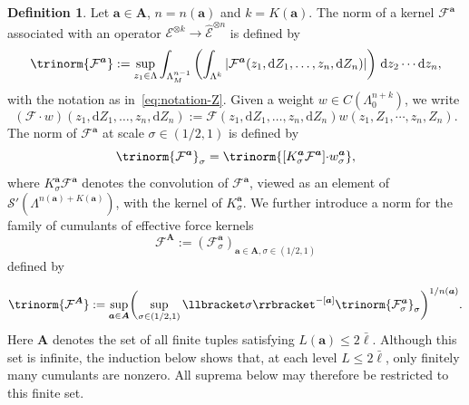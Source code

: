 \documentclass{article}
\numberwithin{equation}{section}
\newcommand{\assign}{:=}
\newcommand{\mathd}{\mathrm{d}}
\theoremstyle{plain}
\theoremstyle{definition}
\newtheorem{definition}[theorem]{Definition}
\begin{document}
\begin{definition}
  \label{def:norm-cumulants}Let $\boldsymbol{a} \in \boldsymbol{A}$, $n = n
  (\boldsymbol{a})$ and $k = K (\boldsymbol{a})$. The norm of a kernel
  $\mathcal{F} ^{\boldsymbol{a}}$ associated with an operator
  $\mathcal{E}^{\otimes k} \rightarrow \hat{\mathcal{E}}^{\otimes n}$ is defined by
  \begin{equation}
    \trinorm{ \mathcal{F} ^{\boldsymbol{a}} } \assign \sup_{z_1 \in
    \Lambda} \int_{\Lambda^{n - 1}_M} \left( \int_{\Lambda^k} |
    \mathcal{F}^{\boldsymbol{a}} (z_1, \mathd Z_1, \ldots, z_n, \mathd Z_n) |
    \right)\,\mathd z_2 \cdots \mathd z_n, \label{eq:basic-norm-cumulant}
  \end{equation}
  with the notation as in~\eqref{eq:notation-Z}. Given a weight $w \in C
  (\Lambda_0^{n + k})$, we write
  \[ (\mathcal{F} \cdot w) (z_1, \mathd Z_1, \ldots, z_n, \mathd Z_n)
     \assign \mathcal{F} (z_1, \mathd Z_1, \ldots, z_n, \mathd Z_n) w (z_1,
     Z_1, \cdots, z_n, Z_n) . \]
  The norm of $\mathcal{F}^{\boldsymbol{a}}$ at scale $\sigma \in (1 / 2, 1)$ is
  defined by
  \begin{equation}
    \trinorm{ \mathcal{F}^{\boldsymbol{a}} }_{\sigma} =
    \trinorm{ [K^{\boldsymbol{a}}_{\sigma} \mathcal{F}^{\boldsymbol{a}}]
    {\cdot w^{\boldsymbol{a}}_{\sigma}}  },
    \label{eq:cumulant-norms-mu}
  \end{equation}
  where $K^{\boldsymbol{a}}_{\sigma} \mathcal{F}^{\boldsymbol{a}}$ denotes
  the convolution of $\mathcal{F}^{\boldsymbol{a}}$, viewed as an element of
  $\mathcal{S}' (\Lambda^{n (\boldsymbol{a}) + K (\boldsymbol{a})})$, with the
  kernel of $K^{\boldsymbol{a}}_{\sigma}$. We further introduce a norm
  for the family of cumulants of effective force kernels
  \[ \mathcal{F}^{\boldsymbol{A}} \assign
     (\mathcal{F}^{\boldsymbol{a}}_{\sigma})_{\boldsymbol{a} \in \boldsymbol{A},
     \sigma \in (1 / 2, 1)} \]
  defined by
  
  
  \begin{equation}
    \trinorm{ \mathcal{F}^{\boldsymbol{A}} } \assign
    \sup_{\boldsymbol{a} \in \boldsymbol{A}}  \biggl(\sup_{\sigma \in (1 / 2, 1)}
    \llbracket \sigma \rrbracket^{- [\boldsymbol{a}]}  \trinorm{
    \mathcal{F}_{\sigma}^{\boldsymbol{a}} }_{\sigma}\biggr)^{1/n
    (\boldsymbol{a})} . \label{eq:norm-family-cumulants}
  \end{equation}
  Here \(\boldsymbol A\) denotes the set of all finite tuples satisfying
  \(L(\boldsymbol a)\le 2\bar\ell\). Although this set is infinite, the induction
  below shows that, at each level \(L\le 2\bar\ell\), only finitely many cumulants
  are nonzero. All suprema below may therefore be restricted to this finite set.
\end{definition}
\end{document}
